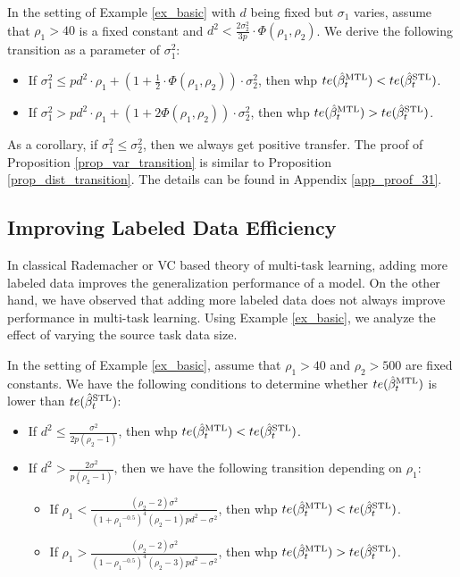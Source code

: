 \begin{proposition}\label{prop_var_transition}
	In the setting of Example \ref{ex_basic} with $d$ being fixed but $\sigma_1$ varies, assume that $\rho_1 > 40$ is a fixed constant and $d^2 < \frac {2\sigma_2^2} {3p} \cdot \Phi(\rho_1, \rho_2)$.
	We derive the following transition as a parameter of $\sigma_1^2$:
	\begin{itemize}
		\item If $\sigma_1^2 \le p d^2 \cdot \rho_1 +\left(1+ \frac12 \cdot \Phi(\rho_1, \rho_2)\right)\cdot\sigma_2^2$, then whp $te(\hat{\beta}_t^{\text{MTL}}) < te(\hat{\beta}_t^{\text{STL}})$.
		\item If $\sigma_1^2 > p d^2 \cdot \rho_1 +\left(1+ 2\Phi(\rho_1, \rho_2)\right) \cdot \sigma_2^2$, then whp $te(\hat{\beta}_t^{\text{MTL}}) > te(\hat{\beta}_t^{\text{STL}})$.
	\end{itemize}
\end{proposition}
As a corollary, if $\sigma_1^2 \le \sigma_2^2$, then we always get positive transfer.
The proof of Proposition \ref{prop_var_transition} is similar to Proposition \ref{prop_dist_transition}.
The details can be found in Appendix \ref{app_proof_31}.


\subsection{Improving Labeled Data Efficiency}\label{sec_data_size}

In classical Rademacher or VC based theory of multi-task learning, adding more labeled data improves the generalization performance of a model.
On the other hand, we have observed that adding more labeled data does not always improve performance in multi-task learning.
Using Example \ref{ex_basic}, we analyze the effect of varying the source task data size.

\begin{proposition}\label{prop_data_size}
	In the setting of Example \ref{ex_basic}, assume that $\rho_1 > 40$ and $\rho_2 > 500$ are fixed constants.
	We have the following conditions to determine whether $te(\hat{\beta}_t^{\text{MTL}})$ is lower than $te(\hat{\beta}_t^{\text{STL}})$:
	\begin{itemize}
\item If $d^2 \le \frac{\sigma^2}{2p(\rho_2-1)}$, then whp $te(\hat{\beta}_t^{\text{MTL}}) < te(\hat{\beta}_t^{\text{STL}})$.
		 
\item If $d^2 > \frac{2\sigma^2}{p (\rho_2 - 1)}$, then we have the following transition depending on $\rho_1$:
		\begin{itemize}
			\item If $\rho_1 < \frac{(\rho_2-2)\sigma^2}{(1 + {\rho_1}^{-0.5})^4(\rho_2 - 1) pd^2 - \sigma^2}$, then whp $te(\hat{\beta}_t^{\text{MTL}}) < te(\hat{\beta}_t^{\text{STL}})$.
			\item If $\rho_1 > \frac{(\rho_2-2) \sigma^2}{(1 - {\rho_1}^{-0.5})^4 (\rho_2 - 3) pd^2 - \sigma^2}$, then whp $te(\hat{\beta}_t^{\text{MTL}}) > te(\hat{\beta}_t^{\text{STL}})$.
		\end{itemize}
	\end{itemize}
\end{proposition}

